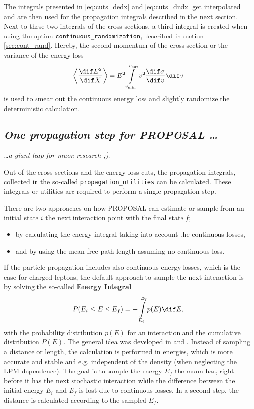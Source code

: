 The integrals presented in \eqref{eq:cuts_dedx} and \eqref{eq:cuts_dndx} get interpolated and are then used for the propagation integrals described in the next section.
Next to these two integrals of the cross-sections, a third integral is created when using the option \texttt{continuous\_randomization}, described in section \ref{sec:cont_rand}.
Hereby, the second momentum of the cross-section or the variance of the energy loss
\begin{align} \label{eq:ecut_de2dx}
    \left\langle \frac{\dif E^2}{\dif X} \right\rangle = E^2 \int\limits_{v_{\min}}^{v_{\textrm{cut}}} v^2 \frac{\dif \sigma}{\dif v} \dif v
\end{align}
is used to smear out the continuous energy loss and slightly randomize the deterministic calculation.

%

\subsection{\textit{One propagation step for PROPOSAL \dots}} \label{sec:prop_util}
\textit{\dots a giant leap for muon research ;).}

Out of the cross-sections and the energy loss cuts, the propagation integrals, collected in the so-called \texttt{propagation\_utilities} can be calculated.
These integrals or utilities are required to perform a single propagation step.

There are two approaches on how PROPOSAL can estimate or sample from an initial state $i$ the next interaction point with the final state $f$;
\begin{itemize}
    \item by calculating the energy integral taking into account the continuous losses,
    \item and by using the mean free path length assuming no continuous loss.
\end{itemize}
If the particle propagation includes also continuous energy losses, which is the case for charged leptons, the default approach to sample the next interaction is by solving the so-called \textbf{Energy Integral}
\begin{align} \label{eq:prop_cdf_general}
    P(E_i \leq E \leq E_f) = - \int\limits_{E_i}^{E_f} p(E) \dif E ,
\end{align}
with the probability distribution $p(E)$ for an interaction and the cumulative distribution $P(E)$.
The general idea was developed in \cite{Sokalski01MUM} and \cite{Chirkin04MMC}.
Instead of sampling a distance or length, the calculation is performed in energies, which is more accurate and stable and e.g. independent of the density (when neglecting the LPM dependence).
The goal is to sample the energy $E_f$ the muon has, right before it has the next stochastic interaction while the difference between the initial energy $E_i$ and $E_f$ is lost due to continuous losses.
In a second step, the distance is calculated according to the sampled $E_f$.

